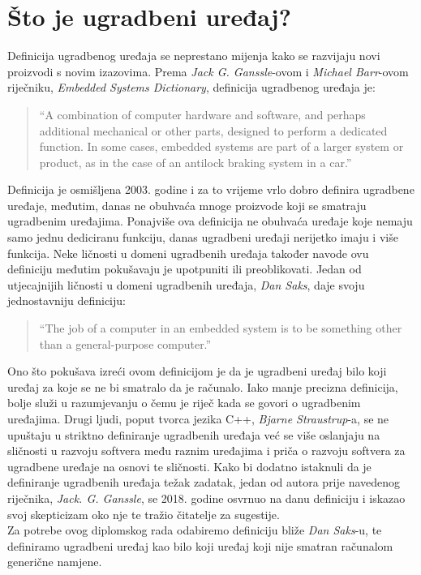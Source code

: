 \section{Što je ugradbeni uređaj?}
Definicija ugradbenog uređaja se neprestano mijenja kako se razvijaju novi proizvodi s novim izazovima. Prema \textit{Jack G. Ganssle}-ovom i \textit{Michael Barr}-ovom riječniku, \textit{Embedded Systems Dictionary}\cite{ganssle2003embedded}, definicija ugradbenog uređaja je:
\begin{quote}
    ``A combination of computer hardware and software, and perhaps additional mechanical or other parts, designed to perform a dedicated function. In some cases, embedded systems are part of a larger system or product, as in the case of an antilock braking system in a car.''
\end{quote}
Definicija je osmišljena 2003. godine i za to vrijeme vrlo dobro definira ugradbene uređaje, međutim, danas ne obuhvaća mnoge proizvode koji se smatraju ugradbenim uređajima. Ponajviše ova definicija ne obuhvaća uređaje koje nemaju samo jednu dediciranu funkciju, danas ugradbeni uređaji nerijetko imaju i više funkcija. Neke ličnosti u domeni ugradbenih uređaja također navode ovu definiciju međutim pokušavaju je upotpuniti ili preoblikovati. Jedan od utjecajnijih ličnosti u domeni ugradbenih uređaja, \textit{Dan Saks}, daje svoju jednostavniju definiciju\cite{danSaksWritingBetterEmbeddedSoftware}:
\begin{quote}
    ``The job of a computer in an embedded system is to be something other than a general-purpose computer.''
\end{quote}
Ono što pokušava izreći ovom definicijom je da je ugradbeni uređaj bilo koji uređaj za koje se ne bi smatralo da je računalo. Iako manje precizna definicija, bolje služi u razumjevanju o čemu je riječ kada se govori o ugradbenim uređajima. Drugi ljudi, poput tvorca jezika C++, \textit{Bjarne Straustrup}-a, se ne upuštaju u striktno definiranje\cite{bjarneC++ForEmbeddedSystems} ugradbenih uređaja već se više oslanjaju na sličnosti u razvoju softvera među raznim uređajima i priča o razvoju softvera za ugradbene uređaje na osnovi te sličnosti. Kako bi dodatno istaknuli da je definiranje ugradbenih uređaja težak zadatak, jedan od autora prije navedenog riječnika, \textit{Jack. G. Ganssle}, se 2018.\cite{embeddedDotComWhatsEmbedded} godine osvrnuo na danu definiciju i iskazao svoj skepticizam oko nje te tražio čitatelje za sugestije. \\
Za potrebe ovog diplomskog rada odabiremo definiciju bliže \textit{Dan Saks}-u, te definiramo ugradbeni uređaj kao bilo koji uređaj koji nije smatran računalom generične namjene.     
\pagebreak

